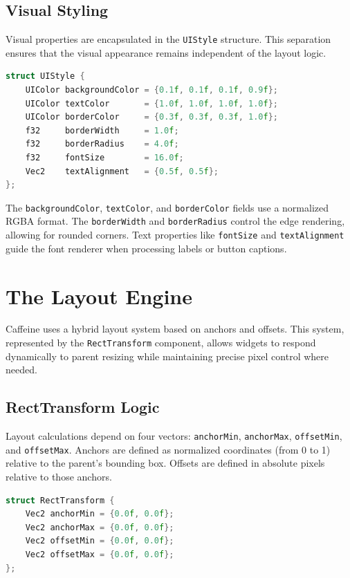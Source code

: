 \subsection{Visual Styling}

Visual properties are encapsulated in the \texttt{UIStyle} structure. This separation ensures that the visual appearance remains independent of the layout logic.

\begin{lstlisting}[language=C++]
struct UIStyle {
    UIColor backgroundColor = {0.1f, 0.1f, 0.1f, 0.9f};
    UIColor textColor       = {1.0f, 1.0f, 1.0f, 1.0f};
    UIColor borderColor     = {0.3f, 0.3f, 0.3f, 1.0f};
    f32     borderWidth     = 1.0f;
    f32     borderRadius    = 4.0f;
    f32     fontSize        = 16.0f;
    Vec2    textAlignment   = {0.5f, 0.5f};
};
\end{lstlisting}

The \texttt{backgroundColor}, \texttt{textColor}, and \texttt{borderColor} fields use a normalized RGBA format. The \texttt{borderWidth} and \texttt{borderRadius} control the edge rendering, allowing for rounded corners. Text properties like \texttt{fontSize} and \texttt{textAlignment} guide the font renderer when processing labels or button captions.

\section{The Layout Engine}

Caffeine uses a hybrid layout system based on anchors and offsets. This system, represented by the \texttt{RectTransform} component, allows widgets to respond dynamically to parent resizing while maintaining precise pixel control where needed.

\subsection{RectTransform Logic}

Layout calculations depend on four vectors: \texttt{anchorMin}, \texttt{anchorMax}, \texttt{offsetMin}, and \texttt{offsetMax}. Anchors are defined as normalized coordinates (from 0 to 1) relative to the parent's bounding box. Offsets are defined in absolute pixels relative to those anchors.

\begin{lstlisting}[language=C++]
struct RectTransform {
    Vec2 anchorMin = {0.0f, 0.0f};
    Vec2 anchorMax = {0.0f, 0.0f};
    Vec2 offsetMin = {0.0f, 0.0f};
    Vec2 offsetMax = {0.0f, 0.0f};
};
\end{lstlisting}

